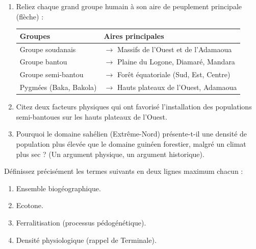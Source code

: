 \documentclass[11pt]{article}
\begin{document}
\begin{exercice}
\begin{enumerate}
    \item Reliez chaque grand groupe humain à son aire de peuplement principale (flèche) :
    \begin{tabular}{ll}
    \textbf{Groupes} & \textbf{Aires principales} \\
    \hline
    Groupe soudanais & \hspace{3cm} $\rightarrow$ \hspace{1cm} Massifs de l'Ouest et de l'Adamaoua \\
    Groupe bantou & \hspace{3cm} $\rightarrow$ \hspace{1cm} Plaine du Logone, Diamaré, Mandara \\
    Groupe semi-bantou & \hspace{3cm} $\rightarrow$ \hspace{1cm} Forêt équatoriale (Sud, Est, Centre) \\
    Pygmées (Baka, Bakola) & \hspace{3cm} $\rightarrow$ \hspace{1cm} Hauts plateaux de l'Ouest, Adamaoua \\
    \end{tabular}
    \item Citez deux facteurs physiques qui ont favorisé l'installation des populations semi-bantoues sur les hauts plateaux de l'Ouest.
    \item Pourquoi le domaine sahélien (Extrême-Nord) présente-t-il une densité de population plus élevée que le domaine guinéen forestier, malgré un climat plus sec ? (Un argument physique, un argument historique).
\end{enumerate}
\end{exercice}

\begin{exercice}
Définissez précisément les termes suivants en deux lignes maximum chacun :
\begin{enumerate}
    \item Ensemble biogéographique.
    \item Ecotone.
    \item Ferralitisation (processus pédogénétique).
    \item Densité physiologique (rappel de Terminale).
\end{enumerate}
\end{exercice}
\end{document}
